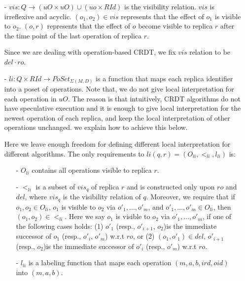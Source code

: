 {\begin{itemize}
\item[-] $vis : Q \rightarrow (uO \times uO) \cup (uo \times RId)$ is the visibility relation. $vis$ is irreflexive and acyclic. $(o_1,o_2) \in vis$ represents that the effect of $o_1$ is visible to $o_2$. $(o,r)$ represents that the effect of $o$ become visible to replica $r$ after the time point of the last operation of replica $r$.

    Since we are dealing with operation-based CRDT, we fix $vis$ relation to be $del \cdot ro$.

\item[-] $li: Q \times RId \rightarrow PoSet_{\Sigma(M,D)}$ is a function that maps each replica identifier into a poset of operations. Note that, we do not give local interpretation for each operation in $uO$. The reason is that intuitively, CRDT algorithms do not have speculative execution and it is enough to give local interpretation for the newest operation of each replica, and keep the local interpretation of other operations unchanged. we explain how to achieve this below.

    Here we leave enough freedom for defining different local interpretation for different algorithms. The only requirements to $li(q,r) = (O_{li},<_{li},l_{li})$ is:

    \begin{itemize}
    \setlength{\itemsep}{0.5pt}
    \item[-] $O_{li}$ contains all operations visible to replica $r$.

    \item[-] $<_{li}$ is a subset of $vis_q$ of replica $r$ and is constructed only upon $ro$ and $del$, where $vis_q$ is the visibility relation of $q$. Moreover, we require that if $o_1,o_2 \in O_{li}$, $o_1$ is visible to $o_2$ via $o'_1,\ldots,o'_m$, and $o'_1,\ldots,o'_m \in O_{li}$, then $(o_1,o_2) \in <_{li}$. Here we say $o_1$ is visible to $o_2$ via $o'_1,\ldots,o'_m$, if one of the following cases holds: (1) $o'_1$ (resp., $o'_{\mathit{i+1}}$, $o_2$)is the immediate successor of $o_1$ (resp., $o'_i$, $o'_m$) w.r.t $ro$, or (2) $(o_1,o'_1) \in del$, $o'_{\mathit{i+1}}$ (resp., $o_2$)is the immediate successor of $o'_i$ (resp., $o'_m$) w.r.t $ro$.

    \item[-] $l_{li}$ is a labeling function that maps each operation $(m,a,b,ird,oid)$ into $(m,a,b)$.
    \end{itemize}


\end{itemize}}
